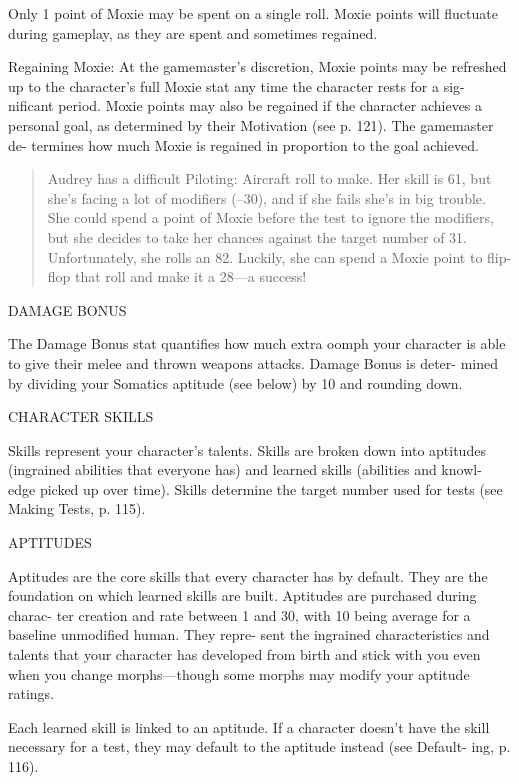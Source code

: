 Only 1 point of Moxie may be spent on a single roll.
Moxie points will fluctuate during gameplay, as they
are spent and sometimes regained.

Regaining Moxie: At the gamemaster's discretion,
Moxie points may be refreshed up to the character's
full Moxie stat any time the character rests for a sig-
nificant period. Moxie points may also be regained if
the character achieves a personal goal, as determined
by their Motivation (see p. 121). The gamemaster de-
termines how much Moxie is regained in proportion
to the goal achieved.

\begin{quotation}
  Audrey has a difficult Piloting: Aircraft roll to make.  Her skill
  is 61, but she's facing a lot of modifiers (–30), and if she fails
  she's in big trouble. She could spend a point of Moxie before the
  test to ignore the modifiers, but she decides to take her chances
  against the target number of 31. Unfortunately, she rolls an
  82. Luckily, she can spend a Moxie point to flip-flop that roll and
  make it a 28—a success!
\end{quotation}

DAMAGE BONUS

The Damage Bonus stat quantifies how much extra
oomph your character is able to give their melee and
thrown weapons attacks. Damage Bonus is deter-
mined by dividing your Somatics aptitude (see below)
by 10 and rounding down.

CHARACTER SKILLS

Skills represent your character's talents. Skills are
broken down into aptitudes (ingrained abilities that
everyone has) and learned skills (abilities and knowl-
edge picked up over time). Skills determine the target
number used for tests (see Making Tests, p. 115).

APTITUDES

Aptitudes are the core skills that every character has
by default. They are the foundation on which learned
skills are built. Aptitudes are purchased during charac-
ter creation and rate between 1 and 30, with 10 being
average for a baseline unmodified human. They repre-
sent the ingrained characteristics and talents that your
character has developed from birth and stick with you
even when you change morphs—though some morphs
may modify your aptitude ratings.


Each learned skill is linked to an aptitude. If a
character doesn't have the skill necessary for a test,
they may default to the aptitude instead (see Default-
ing, p. 116).


